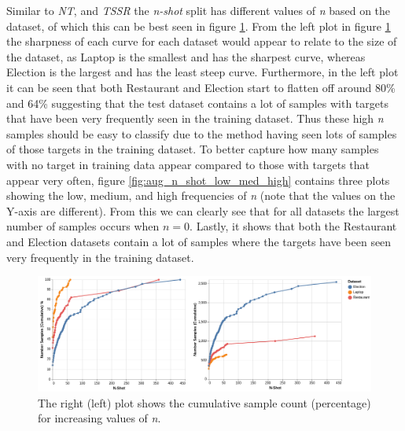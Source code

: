 Similar to \textit{NT}, and \textit{TSSR} the \textit{n-shot} split has different values of \textit{n} based on the dataset, of which this can be best seen in figure \ref{fig:aug_n_shot_cuml}. From the left plot in figure \ref{fig:aug_n_shot_cuml} the sharpness of each curve for each dataset would appear to relate to the size of the dataset, as Laptop is the smallest and has the sharpest curve, whereas Election is the largest and has the least steep curve. Furthermore, in the left plot it can be seen that both Restaurant and Election start to flatten off around 80\% and 64\% suggesting that the test dataset contains a lot of samples with targets that have been very frequently seen in the training dataset. Thus these high \textit{n} samples should be easy to classify due to the method having seen lots of samples of those targets in the training dataset. To better capture how many samples with no target in training data appear compared to those with targets that appear very often, figure \ref{fig:aug_n_shot_low_med_high} contains three plots showing the low, medium, and high frequencies of \textit{n} (note that the values on the Y-axis are different). From this we can clearly see that for all datasets the largest number of samples occurs when $n=0$. Lastly, it shows that both the Restaurant and Election datasets contain a lot of samples where the targets have been seen very frequently in the training dataset.

\begin{figure}[h!]
    \centering
    \includegraphics[scale=0.4]{images/augmentation/error_analysis/n_shot_cuml.png}
    \caption{The right (left) plot shows the cumulative sample count (percentage) for increasing values of \textit{n}.}
    \label{fig:aug_n_shot_cuml}
\end{figure}

